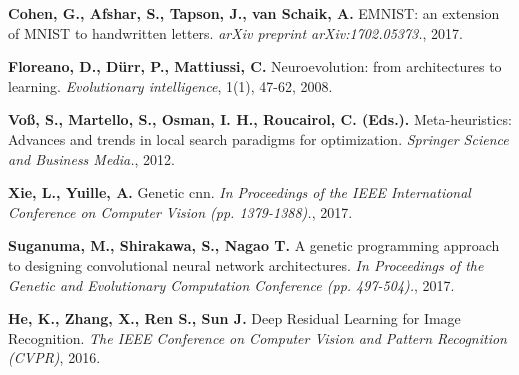 \documentclass[eng]{simposium}
\begin{document}
\begin{thebibliography}{99}
\textbf{Cohen, G., Afshar, S., Tapson, J., van Schaik, A.} EMNIST: an extension of MNIST to handwritten letters. \emph{arXiv preprint arXiv:1702.05373.}, 2017.

\textbf{Floreano, D., Dürr, P., Mattiussi, C.} Neuroevolution: from architectures to learning. \emph{Evolutionary intelligence}, 1(1), 47-62, 2008.

\textbf{Voß, S., Martello, S., Osman, I. H., Roucairol, C. (Eds.).} Meta-heuristics: Advances and trends in local search paradigms for optimization. \emph{Springer Science and Business Media.}, 2012.

\textbf{Xie, L., Yuille, A. } Genetic cnn. \emph{In Proceedings of the IEEE International Conference on Computer Vision (pp. 1379-1388).}, 2017.

\textbf{Suganuma, M., Shirakawa, S., Nagao T. } A genetic programming approach to designing convolutional neural network architectures. \emph{In Proceedings of the Genetic and Evolutionary Computation Conference (pp. 497-504).}, 2017.

\textbf{He, K., Zhang, X., Ren S., Sun J.} Deep Residual Learning for Image Recognition. \emph{The IEEE Conference on Computer Vision and Pattern Recognition (CVPR)}, 2016.

\end{thebibliography}
\end{document}
